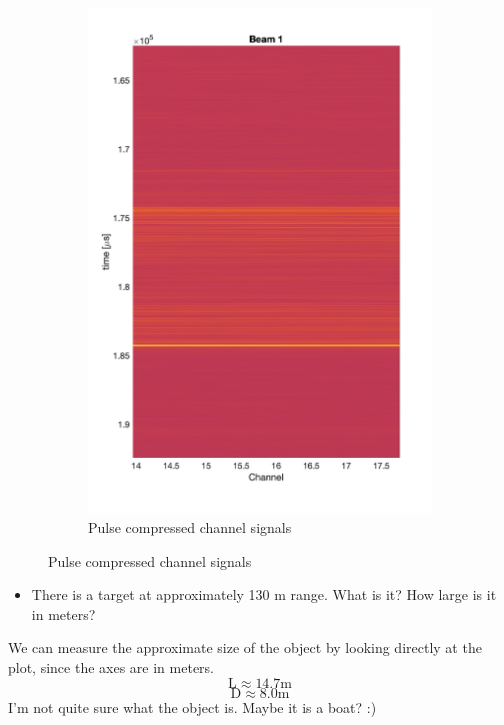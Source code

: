 \documentclass{article}
\begin{document}
\begin{figure}[ht]
\begin{subfigure}{0.3\textwidth}
        \label{fig:sub1}
    \end{subfigure}
    \hspace{0.05\textwidth}
    \begin{subfigure}{0.3\textwidth} %
        \centering
        \includegraphics[width=\linewidth]{compressed.jpg} %
        \caption{Pulse compressed channel signals}
        \label{fig:sub2}
    \end{subfigure}
    \label{fig:main}
\end{figure}


\begin{itemize}
    \item There is a target at approximately 130 m range. What is it? How large is it in meters?
\end{itemize}

We can measure the approximate size of the object by looking directly at the plot, since the axes are in meters.
\[\text{L} \approx 14.7\text{m}\]
\[\text{D} \approx 8.0\text{m}\]
I'm not quite sure what the object is. Maybe it is a boat? :)
\end{document}
